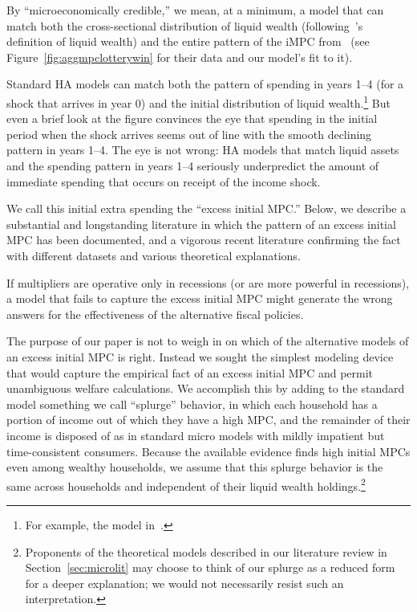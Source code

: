\documentclass[\latexroot/\projectname]{subfiles}
\begin{document}
\label{microeconomically-credible}
By ``microeconomically credible,'' we mean, at a minimum, a model that can match both the cross-sectional distribution of liquid wealth (following~\cite{kaplan2014model}'s definition of liquid wealth) and the entire pattern of the iMPC from~\cite{fagereng-mpc-2021} (see Figure~\ref{fig:aggmpclotterywin} for their data and our model's fit to it).

\label{excess-initial-mpc}
Standard HA models can match both the pattern of spending in years 1--4 (for a shock that arrives in year 0) and the initial distribution of liquid wealth.\footnote{For example, the model in~\cite{cstwMPC}.}  But even a brief look at the figure convinces the eye that spending in the initial period when the shock arrives seems out of line with the smooth declining pattern in years 1--4.  The eye is not wrong: HA models that match liquid assets and the spending pattern in years 1--4 seriously underpredict the amount of immediate spending that occurs on receipt of the income shock.

We call this initial extra spending the ``excess initial MPC.''  Below, we describe a substantial and longstanding literature in which the pattern of an excess initial MPC has been documented, and a vigorous recent literature confirming the fact with different datasets and various theoretical explanations.

If multipliers are operative only in recessions (or are more powerful in recessions), a model that fails to capture the excess initial MPC might generate the wrong answers for the effectiveness of the alternative fiscal policies.

The purpose of our paper is not to weigh in on which of the alternative models of an excess initial MPC is right.  Instead we sought the simplest modeling device that would capture the empirical fact of an excess initial MPC and permit unambiguous welfare calculations.  We accomplish this by adding to the standard model something we call ``splurge'' behavior, in which each household has a portion of income out of which they have a high MPC, and the remainder of their income is disposed of as in standard micro models with mildly impatient but time-consistent consumers.  Because the available evidence finds high initial MPCs even among wealthy households, we assume that this splurge behavior is the same across households and independent of their liquid wealth holdings.\footnote{Proponents of the theoretical models described in our literature review in Section~\ref{sec:microlit} may choose to think of our splurge as a reduced form for a deeper explanation; we would not necessarily resist such an interpretation.}
\end{document}
